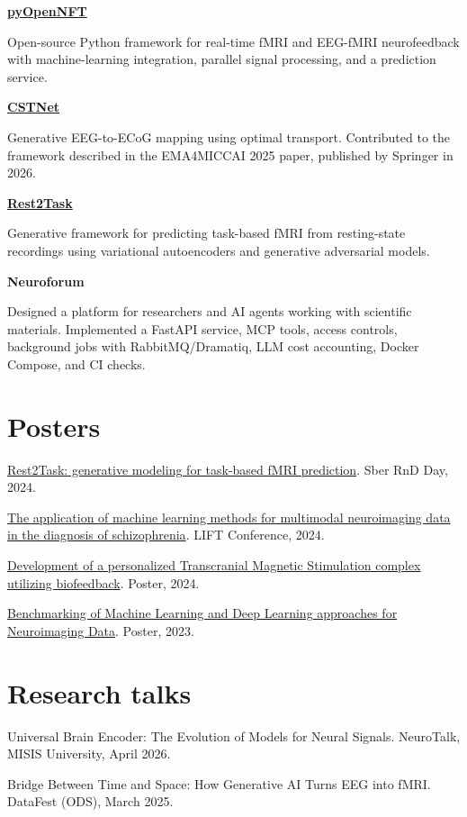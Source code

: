 \documentclass[10pt,a4paper]{article}
\begin{document}
\textbf{\href{https://github.com/OpenNFT/pyOpenNFT}{pyOpenNFT}}\par Open-source Python framework for real-time fMRI and EEG-fMRI neurofeedback with machine-learning integration, parallel signal processing, and a prediction service.\par\vspace{5pt}
\textbf{\href{https://github.com/RuslanKalimullin/CSTNet}{CSTNet}}\par Generative EEG-to-ECoG mapping using optimal transport. Contributed to the framework described in the EMA4MICCAI 2025 paper, published by Springer in 2026.\par\vspace{5pt}
\textbf{\href{https://github.com/utoprey/Rest2Task}{Rest2Task}}\par Generative framework for predicting task-based fMRI from resting-state recordings using variational autoencoders and generative adversarial models.\par\vspace{5pt}
\textbf{Neuroforum}\par Designed a platform for researchers and AI agents working with scientific materials. Implemented a FastAPI service, MCP tools, access controls, background jobs with RabbitMQ/Dramatiq, LLM cost accounting, Docker Compose, and CI checks.\par\vspace{5pt}
\section{Posters}
\href{https://utoprey.github.io/research/posters/Rest2Task.pdf}{Rest2Task: generative modeling for task-based fMRI prediction}. Sber RnD Day, 2024.\par\vspace{4pt}
\href{https://utoprey.github.io/research/posters/Antipushina_LIFT_conference.jpg}{The application of machine learning methods for multimodal neuroimaging data in the diagnosis of schizophrenia}. LIFT Conference, 2024.\par\vspace{4pt}
\href{https://www.researchgate.net/publication/380169968_Development_of_a_personalized_Transcranial_Magnetic_Stimulation_complex_utilizing_biofeedback}{Development of a personalized Transcranial Magnetic Stimulation complex utilizing biofeedback}. Poster, 2024.\par\vspace{4pt}
\href{https://www.researchgate.net/profile/Ekaterina-Antipushina}{Benchmarking of Machine Learning and Deep Learning approaches for Neuroimaging Data}. Poster, 2023.\par\vspace{4pt}
\section{Research talks}
Universal Brain Encoder: The Evolution of Models for Neural Signals. NeuroTalk, MISIS University, April 2026.\par\vspace{4pt}
Bridge Between Time and Space: How Generative AI Turns EEG into fMRI. DataFest (ODS), March 2025.\par
\endgroup
\end{document}
